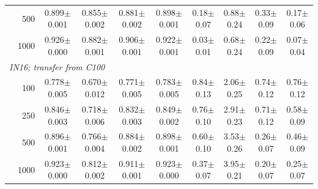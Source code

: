 \begin{table}[h]
{\begin{tabular}{l r cccc cccc}
\quad & 500 & 0.899\tiny{$\pm$0.001} & 0.855\tiny{$\pm$0.002} & 0.881\tiny{$\pm$0.002} & 0.898\tiny{$\pm$0.001} & 0.18\tiny{$\pm$0.07} & 0.88\tiny{$\pm$0.24} & 0.33\tiny{$\pm$0.09} & 0.17\tiny{$\pm$0.06} \\
\quad & 1000 & 0.926\tiny{$\pm$0.000} & 0.882\tiny{$\pm$0.001} & 0.906\tiny{$\pm$0.001} & 0.922\tiny{$\pm$0.001} & 0.03\tiny{$\pm$0.01} & 0.68\tiny{$\pm$0.24} & 0.22\tiny{$\pm$0.09} & 0.07\tiny{$\pm$0.04} \\
\multicolumn{10}{l}{\emph{IN16; transfer from C100}} \\
\quad & 100 & 0.778\tiny{$\pm$0.005} & 0.670\tiny{$\pm$0.012} & 0.771\tiny{$\pm$0.005} & 0.783\tiny{$\pm$0.005} & 0.84\tiny{$\pm$0.13} & 2.06\tiny{$\pm$0.25} & 0.74\tiny{$\pm$0.12} & 0.76\tiny{$\pm$0.12} \\
\quad & 250 & 0.846\tiny{$\pm$0.003} & 0.718\tiny{$\pm$0.006} & 0.832\tiny{$\pm$0.003} & 0.849\tiny{$\pm$0.002} & 0.76\tiny{$\pm$0.10} & 2.91\tiny{$\pm$0.23} & 0.71\tiny{$\pm$0.12} & 0.58\tiny{$\pm$0.09} \\
\quad & 500 & 0.896\tiny{$\pm$0.001} & 0.766\tiny{$\pm$0.004} & 0.884\tiny{$\pm$0.002} & 0.898\tiny{$\pm$0.001} & 0.60\tiny{$\pm$0.10} & 3.53\tiny{$\pm$0.26} & 0.26\tiny{$\pm$0.07} & 0.46\tiny{$\pm$0.09} \\
\quad & 1000 & 0.923\tiny{$\pm$0.000} & 0.812\tiny{$\pm$0.002} & 0.911\tiny{$\pm$0.001} & 0.923\tiny{$\pm$0.000} & 0.37\tiny{$\pm$0.07} & 3.95\tiny{$\pm$0.21} & 0.20\tiny{$\pm$0.07} & 0.25\tiny{$\pm$0.07} \\
\bottomrule
\end{tabular}}
\end{table}
